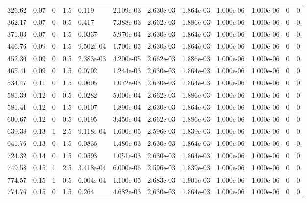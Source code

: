 \documentclass[preview]{standalone}
\begin{document}
{{\begin{tabular}{L{1.2cm}C{1.2cm} C{0.3cm}C{0.5cm} C{1.4cm}C{1.4cm} C{1.4cm}C{1.4cm} C{1.6cm}C{1.6cm} C{1.6cm}C{1.6cm}}
  326.62  &  0.07  & 0     & 1.5 &  0.119  & 2.109e-03  &  2.630e-03&   1.864e-03& 1.000e-06 & 1.000e-06   &  0 & 0  \\ 
  362.17  &  0.07  & 0     & 0.5 &  0.417  & 7.388e-03  &  2.662e-03&   1.886e-03& 1.000e-06 & 1.000e-06   &  0 & 0  \\ 
  371.03  &  0.07  & 0     & 1.5 &  0.0337  & 5.970e-04  &  2.630e-03&   1.864e-03& 1.000e-06 & 1.000e-06   &  0 & 0  \\ 
  446.76  &  0.09  & 0     & 1.5 &  9.502e-04  & 1.700e-05  &  2.630e-03&   1.864e-03& 1.000e-06 & 1.000e-06   &  0 & 0  \\ 
  452.30  &  0.09  & 0     & 0.5 &  2.383e-03  & 4.200e-05  &  2.662e-03&   1.886e-03& 1.000e-06 & 1.000e-06   &  0 & 0  \\ 
  465.41  &  0.09  & 0     & 1.5 &  0.0702  & 1.244e-03  &  2.630e-03&   1.864e-03& 1.000e-06 & 1.000e-06   &  0 & 0  \\ 
  534.47  &  0.11  & 0     & 1.5 &  0.0605  & 1.072e-03  &  2.630e-03&   1.864e-03& 1.000e-06 & 1.000e-06   &  0 & 0  \\ 
  581.39  &  0.12  & 0     & 0.5 &  0.0282  & 5.000e-04  &  2.662e-03&   1.886e-03& 1.000e-06 & 1.000e-06   &  0 & 0  \\ 
  581.41  &  0.12  & 0     & 1.5 &  0.0107  & 1.890e-04  &  2.630e-03&   1.864e-03& 1.000e-06 & 1.000e-06   &  0 & 0  \\ 
  600.67  &  0.12  & 0     & 0.5 &  0.0195  & 3.450e-04  &  2.662e-03&   1.886e-03& 1.000e-06 & 1.000e-06   &  0 & 0  \\ 
  639.38  &  0.13  & 1     & 2.5 &  9.118e-04  & 1.600e-05  &  2.596e-03&   1.839e-03& 1.000e-06 & 1.000e-06   &  0 & 0  \\ 
  641.76  &  0.13  & 0     & 1.5 &  0.0836  & 1.480e-03  &  2.630e-03&   1.864e-03& 1.000e-06 & 1.000e-06   &  0 & 0  \\ 
  724.32  &  0.14  & 0     & 1.5 &  0.0593  & 1.051e-03  &  2.630e-03&   1.864e-03& 1.000e-06 & 1.000e-06   &  0 & 0  \\ 
  749.58  &  0.15  & 1     & 2.5 &  3.418e-04  & 6.000e-06  &  2.596e-03&   1.839e-03& 1.000e-06 & 1.000e-06   &  0 & 0  \\ 
  774.57  &  0.15  & 1     & 0.5 &  6.004e-04  & 1.100e-05  &  2.683e-03&   1.901e-03& 1.000e-06 & 1.000e-06   &  0 & 0  \\ 
  774.76  &  0.15  & 0     & 1.5 &  0.264  & 4.682e-03  &  2.630e-03&   1.864e-03& 1.000e-06 & 1.000e-06   &  0 & 0  \\ 
\hline 
\end{tabular} 

}}
\end{document}
